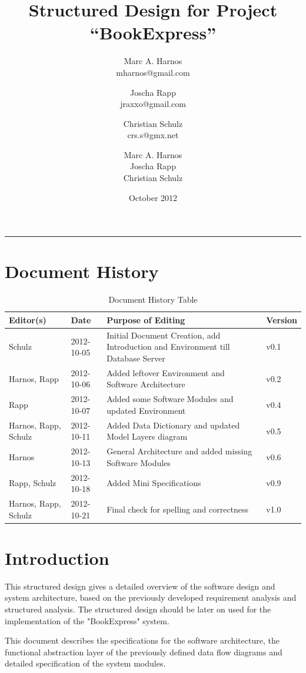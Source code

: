 \documentclass[11pt,a4paper,oneside,svgnames]{report}
\title{Structured Design for Project ``BookExpress''}
\author{Marc A. Harnos\\ {mharnos@gmail.com} \and Joscha Rapp\\ {jraxxo@gmail.com} \and Christian Schulz\\ {crs.s@gmx.net}}
\author{Marc A. Harnos\\ Joscha Rapp\\ Christian Schulz}
\date{October 2012}
\makeatletter
\renewcommand{\maketitle}{\begin{titlepage}%
    \let\footnotesize\small
    \let\footnoterule\relax
    \parindent \z@
    \reset@font
    \null\vfil
    \begin{flushleft}
      \huge \@title
    \end{flushleft}
    \par
    \hrule height 4pt
    \par
    \begin{flushright}
      \LARGE \@author \par
    \end{flushright}
    \vskip 60\p@
    \vfil\null
  \end{titlepage}%
  \setcounter{footnote}{0}%
}
\makeatother
\begin{document}
\maketitle
\tableofcontents

\chapter*{Document History}

\begin{table}[H]
\centering
\begin{tabular}{|p{3.8cm}|p{2cm}|p{5.5cm}|p{1.2cm}|}
\hline 
Editor(s) & Date & Purpose of Editing & Version \\ 
\hline 
Schulz & 2012-10-05 & Initial Document Creation, add Introduction and Environment till Database Server & v0.1 \\ 
\hline
Harnos, Rapp & 2012-10-06 & Added leftover Environment and Software Architecture & v0.2 \\ 
\hline
Rapp & 2012-10-07 & Added some Software Modules and updated Environment & v0.4 \\ 
\hline 
Harnos, Rapp, Schulz & 2012-10-11 & Added Data Dictionary and updated Model Layers diagram & v0.5 \\ 
\hline
Harnos & 2012-10-13 & General Architecture and added missing Software Modules  & v0.6 \\ 
\hline 
Rapp, Schulz & 2012-10-18 & Added Mini Specifications & v0.9\\ 
\hline
Harnos, Rapp, Schulz & 2012-10-21 & Final check for spelling and correctness & v1.0\\ 
\hline 
\end{tabular}
\caption{Document History Table}
\label{tab:document-history}
\end{table}


\chapter{Introduction}
This structured design gives a detailed overview of the software design and system architecture, based on the previously developed requirement analysis and structured analysis. The structured design should be later on used for the implementation of the "BookExpress" system.

This document describes the specifications for the software architecture, the functional abstraction layer of the previously defined data flow diagrams and detailed specification of the system modules.
\end{document}

